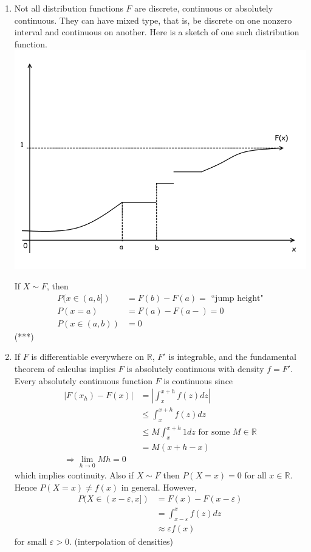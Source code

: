 \documentclass{article}
\newcommand{\R}{\mathbb{R}}
\begin{document}
	\begin{myrem}{}{}
		\begin{enumerate}
			\item Not all distribution functions $F$ are discrete, continuous or absolutely continuous. They can have mixed type, that is, be discrete on one nonzero interval and continuous on another. Here is a sketch of one such distribution function.\\
			\includegraphics[scale=.5]{graph2.png}
			
			If $X\sim F$, then
			\begin{align*}
				P(x\in(a, b])&=F(b)-F(a)=\mbox{ ``jump height"}\\
				P(x=a)&=F(a)-F(a-)=0\\
				P(x\in(a, b))&=0
			\end{align*} (***)
			
			\item If $F$ is differentiable everywhere on $\R$, $F'$ is integrable, and the fundamental theorem of calculus implies $F$ is absolutely continuous with density $f=F'$.\\
			
			Every absolutely continuous function $F$ is continuous since
			\begin{align*}
				|F(x_h)-F(x)|&=|\int_{x}^{x+h}f(z)dz|\\
				&\leq\int_{x}^{x+h}f(z)dz\\
				&\leq M\int_{x}^{x+h}1dz\mbox{ for some $M\in\R$}\\
				&=M(x+h-x)\\
				\Rightarrow\lim_{h\to0}Mh=0
			\end{align*}
			which implies continuity. Also if $X\sim F$ then $P(X=x)=0$ for all $x\in\R$. Hence $P(X=x)\neq f(x)$ in general. However,
			\begin{align*}
				P(X\in(x-\varepsilon, x])&=F(x)-F(x-\varepsilon)\\
				&=\int_{x-\varepsilon}^{x}f(z)dz\\
				&\approx\varepsilon f(x)
			\end{align*}
			for small $\varepsilon>0$. (interpolation of densities)
			\newpage
			

\end{enumerate}
\end{myrem}
\end{document}
